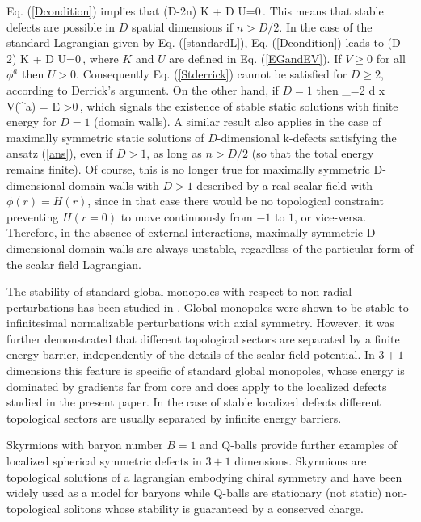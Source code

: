 \documentclass[prd,twocolumn,a4paper,superscriptaddress,floatfix]{revtex4}
\begin{document}
Eq. (\ref{Dcondition}) implies that
\be
\label{Stderrick1}
(D-2n) K + D U=0\,.
\ee
This means that stable defects are possible in $D$ spatial dimensions if $n>D/2$. In the case of the standard Lagrangian given by Eq. (\ref{standardL}), Eq. (\ref{Dcondition}) leads to
\be
\label{Stderrick}
(D-2) K + D U=0\,,
\ee
where $K$ and $U$ are defined in Eq. (\ref{EGandEV}). If $V \ge 0$ for all $\phi^a$ then $U>0$. Consequently Eq. (\ref{Stderrick}) cannot be satisfied for $D \ge 2$, according to Derrick's argument. On the other hand, if $D=1$ then
\ben\label{D2condition1}
_{}=2 \int d x  V(\phi^a) = E >0\,,
\een
which signals the existence of stable static solutions with finite energy for $D=1$ (domain walls). A similar result also applies in the case of maximally symmetric static solutions of $D$-dimensional k-defects satisfying the ansatz (\ref{ans}), even if $D>1$, as long as $n>D/2$ (so that the total energy remains finite). Of course, this is no longer true for maximally symmetric D-dimensional domain walls with $D >1$ described by a real scalar field with $\phi(r)=H(r)$, since in that case there would be no topological constraint preventing $H(r=0)$ to move continuously from $-1$ to $1$, or vice-versa. Therefore, in the absence of external interactions, maximally symmetric D-dimensional domain walls are always unstable, regardless of the particular form of the scalar field Lagrangian.

The stability of standard global monopoles with respect to non-radial perturbations has been studied in \cite{1992NuPhB.375..665P,1989PhRvL..63.2158G,1991PhRvL..67.1173R,2000PhRvL..85.3091A,2002PhRvD..66h5019W}. Global monopoles were shown to be stable to infinitesimal normalizable perturbations with axial symmetry. However, it was further demonstrated that different topological sectors are separated by a finite energy barrier, independently of the details of the scalar field potential. In $3+1$ dimensions this feature is specific of standard global monopoles, whose energy is dominated by gradients far from core and does apply to the localized defects studied in the present paper.  In the case of stable localized defects different topological sectors are usually separated by infinite energy barriers.

Skyrmions with baryon number $B=1$ and Q-balls provide further examples of localized spherical symmetric defects in $3+1$ dimensions. Skyrmions \cite{1962NucPh..31..556S} are topological solutions of a lagrangian embodying chiral symmetry and have been widely used as a model for baryons while Q-balls \cite{1985NuPhB.262..263C} are stationary (not static) non-topological solitons whose stability is guaranteed by a conserved charge.
\end{document}
